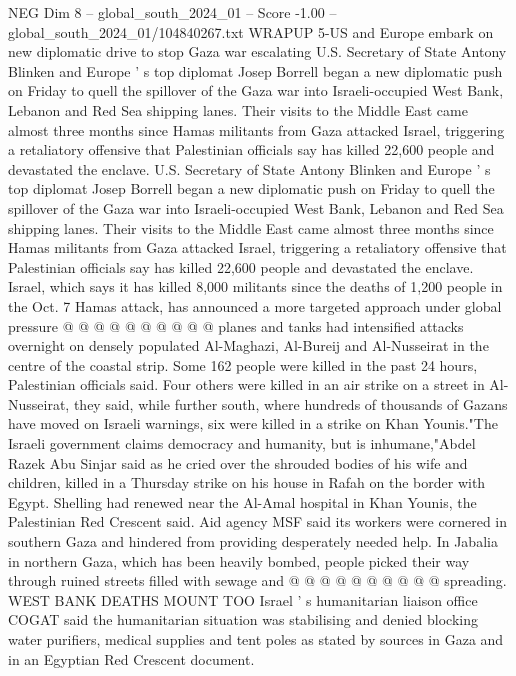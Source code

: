 \begin{textsample}{NEG Dim 8 – global\_south\_2024\_01 – Score -1.00 – global\_south\_2024\_01/104840267.txt}  \label{ex:f8_neg_054}
WRAPUP 5-US and Europe embark on new diplomatic drive to stop Gaza war escalating U.S.
Secretary of State Antony Blinken and Europe ' s top diplomat Josep Borrell began a new diplomatic push on Friday to quell the spillover of the Gaza war into Israeli-occupied West Bank, Lebanon and Red Sea shipping lanes.
Their visits to the Middle East came almost three months since Hamas militants from Gaza attacked Israel, triggering a retaliatory offensive that Palestinian officials say has killed 22,600 people and devastated the enclave.
U.S.
Secretary of State Antony Blinken and Europe ' s top diplomat Josep Borrell began a new diplomatic push on Friday to quell the spillover of the Gaza war into Israeli-occupied West Bank, Lebanon and Red Sea shipping lanes.
Their visits to the Middle East came almost three months since Hamas militants from Gaza attacked Israel, triggering a retaliatory offensive that Palestinian officials say has killed 22,600 people and devastated the enclave.
Israel, which says it has killed 8,000 militants since the deaths of 1,200 people in the Oct. 7 Hamas attack, has announced a more targeted approach under global pressure @ @ @ @ @ @ @ @ @ @ planes and tanks had intensified attacks overnight on densely populated Al-Maghazi, Al-Bureij and Al-Nusseirat in the centre of the coastal strip.
Some 162 people were killed in the past 24 hours, Palestinian officials said.
Four others were killed in an air strike on a street in Al-Nusseirat, they said, while further south, where hundreds of thousands of Gazans have moved on Israeli warnings, six were killed in a strike on Khan Younis."The Israeli government claims democracy and humanity, but is inhumane,"Abdel Razek Abu Sinjar said as he cried over the shrouded bodies of his wife and children, killed in a Thursday strike on his house in Rafah on the border with Egypt.
Shelling had renewed near the Al-Amal hospital in Khan Younis, the Palestinian Red Crescent said.
Aid agency MSF said its workers were cornered in southern Gaza and hindered from providing desperately needed help.
In Jabalia in northern Gaza, which has been heavily bombed, people picked their way through ruined streets filled with sewage and @ @ @ @ @ @ @ @ @ @ spreading.
WEST BANK DEATHS MOUNT TOO Israel ' s humanitarian liaison office COGAT said the humanitarian situation was stabilising and denied blocking water purifiers, medical supplies and tent poles as stated by sources in Gaza and in an Egyptian Red Crescent document.

\end{textsample}
